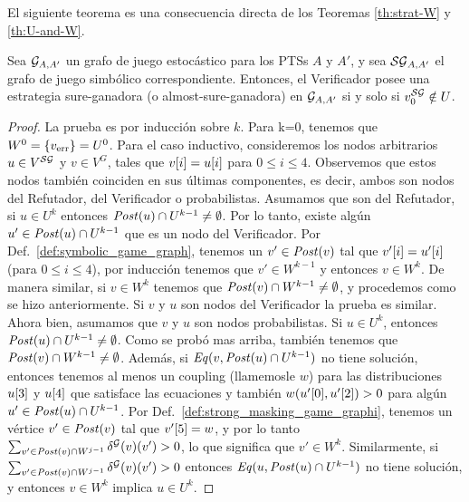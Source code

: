 El siguiente teorema es una consecuencia directa de los Teoremas
\ref{th:strat-W} y \ref{th:U-and-W}.

\begin{theorem}
  Sea $\StochG_{A,A'}$ un grafo de juego estocástico para los PTSs $A$
  y $A'$, y sea $\SymbG_{A,A'}$ el grafo de juego simbólico correspondiente.  Entonces, el Verificador posee una estrategia sure-ganadora (o almost-sure-ganadora) en
  $\StochG_{A,A'}$ si y solo si $v^\SymbG_0 \notin U$.
\end{theorem}

\noindent
\noindent
\begin{proof}  
La prueba es por inducción sobre $k$. Para k=0, tenemos que $W^0 = \{ \ErrorSt \} = U^0$. Para el caso inductivo, consideremos los nodos arbitrarios $u \in V^\SymbG$ y $v \in V^{G}$,
tales que $\pr{i}{v} = \pr{i}{u}$ para $0 \leq i \leq 4$. Observemos que estos nodos también coinciden en sus últimas componentes, es decir, ambos son nodos del Refutador, del Verificador o probabilistas. 
Asumamos que son del Refutador, si $u \in U^{k}$ entonces $\post(u) \cap U^{k-1} \neq \emptyset$. 
Por lo tanto, existe algún $u' \in \post(u) \cap U^{k-1}$ que es un nodo del Verificador.  Por Def.~\ref{def:symbolic_game_graph}, tenemos un $v' \in \post(v)$ tal que $\pr{i}{v'}=\pr{i}{u'}$ (para $0\leq i \leq 4$), por inducción tenemos que $v' \in W^{k-1}$ 
y entonces $v \in W^k$. 
De manera similar, si $v \in W^k$ tenemos que $\post(v) \cap W^{k-1} \neq \emptyset$, y procedemos como se hizo anteriormente. 
Si $v$ y $u$ son nodos del Verificador la prueba es similar.
Ahora bien, asumamos que $v$ y $u$ son nodos probabilistas. 
Si $u \in U^k$, entonces $\post(u) \cap U^{k-1} \neq \emptyset$. Como se probó mas arriba, también tenemos que  $\post(v) \cap W^{k-1} \neq \emptyset$. 
Además, si $\Eq(v, \post(u) \cap U^{k-1})$ no tiene solución, entonces tenemos al menos un coupling (llamemosle $w$) para las distribuciones
$\pr{3}{u}$ y $\pr{4}{u}$ que satisface las ecuaciones y también $w(\pr{0}{u'},\pr{2}{u'})>0$ para algún $u' \in \post(u) \cap U^{k-1}$. 
Por Def.~\ref{def:strong_masking_game_graphi}, tenemos un vértice $v' \in \post(v)$ tal que $\pr{5}{v'}=w$, y por lo tanto $\sum_{v' \in \post(v) \cap W^{j-1}} \delta^\StochG(v)(v') >0$, lo que significa que $v' \in W^k$. 
Similarmente, si $\sum_{v' \in \post(v) \cap W^{j-1}} \delta^\StochG(v)(v') >0$  entonces $\Eq(u, \post(u) \cap U^{k-1})$ no tiene solución, y entonces
$v\in W^k$ implica $u \in U^k$.
\end{proof} \\
